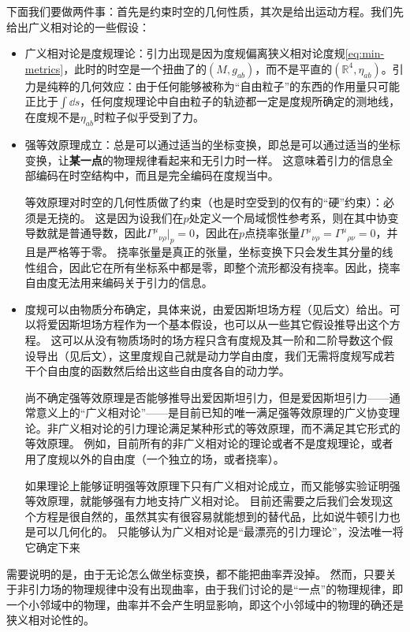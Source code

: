 \documentclass[hyperref, UTF8, a4paper]{ctexart}
\renewcommand{\emph}[1]{\textbf{#1}}
\begin{document}
下面我们要做两件事：首先是约束时空的几何性质，其次是给出运动方程。我们先给出广义相对论的一些假设：
\begin{itemize}
    \item 广义相对论是度规理论：引力出现是因为度规偏离狭义相对论度规\eqref{eq:min-metrics}，此时的时空是一个扭曲了的$(M, g_{ab})$，而不是平直的$(\mathbb{R}^4, \eta_{ab})$。引力是纯粹的几何效应：由于任何能够被称为“自由粒子”的东西的作用量只可能正比于$\int \dd{s}$，任何度规理论中自由粒子的轨迹都一定是度规所确定的测地线，在度规不是$\eta_{ab}$时粒子似乎受到了力。
    \item 强等效原理成立：总是可以通过适当的坐标变换，即总是可以通过适当的坐标变换，让\emph{某一点}的物理规律看起来和无引力时一样。
    这意味着引力的信息全部编码在时空结构中，而且是完全编码在度规当中。

	等效原理对时空的几何性质做了约束（也是时空受到的仅有的“硬”约束）：必须是无挠的。
	这是因为设我们在$p$处定义一个局域惯性参考系，则在其中协变导数就是普通导数，因此$\Gamma^\mu{}_{\nu \rho}|_{p} = 0$，因此在$p$点挠率张量$\Gamma^\mu{}_{\nu \rho} = \Gamma^\mu{}_{\rho \nu} = 0$，并且是严格等于零。
	挠率张量是真正的张量，坐标变换下只会发生其分量的线性组合，因此它在所有坐标系中都是零，即整个流形都没有挠率。因此，挠率自由度无法用来编码关于引力的信息。
	\item 度规可以由物质分布确定，具体来说，由爱因斯坦场方程（见后文）给出。可以将爱因斯坦场方程作为一个基本假设，也可以从一些其它假设推导出这个方程。
	这可以从没有物质场时的场方程只含有度规及其一阶和二阶导数这个假设导出（见后文），这里度规自己就是动力学自由度，我们无需将度规写成若干个自由度的函数然后给出这些自由度各自的动力学。
    
	尚不确定强等效原理是否能够推导出爱因斯坦引力，但是爱因斯坦引力——通常意义上的“广义相对论”——是目前已知的唯一满足强等效原理的广义协变理论。非广义相对论的引力理论满足某种形式的等效原理，而不满足其它形式的等效原理。
	例如，目前所有的非广义相对论的理论或者不是度规理论，或者用了度规以外的自由度（一个独立的场，或者挠率）。

	如果理论上能够证明强等效原理下只有广义相对论成立，而又能够实验证明强等效原理，就能够强有力地支持广义相对论。
	目前还需要之后我们会发现这个方程是很自然的，虽然其实有很容易就能想到的替代品，比如说牛顿引力也是可以几何化的。
	只能够认为广义相对论是“最漂亮的引力理论”，没法唯一将它确定下来
\end{itemize}

需要说明的是，由于无论怎么做坐标变换，都不能把曲率弄没掉。
然而，只要关于非引力场的物理规律中没有出现曲率，由于我们讨论的是“一点”的物理规律，即一个小邻域中的物理，曲率并不会产生明显影响，即这个小邻域中的物理的确还是狭义相对论性的。
\end{document}
